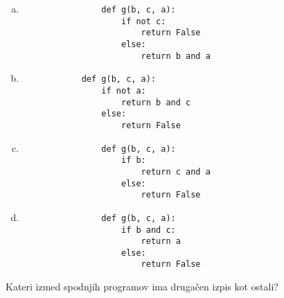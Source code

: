 \documentclass[arhiv, 10pt]{../izpit}
\begin{document}
        \begin{multicols}{2}
        \begin{enumerate}[(a)]
\item 
                \begin{verbatim}
                def g(b, c, a):
                    if not c:
                        return False
                    else:
                        return b and a
                \end{verbatim}
            
\item 
            \begin{verbatim}
            def g(b, c, a):
                if not a:
                    return b and c
                else:
                    return False
            \end{verbatim}
        
\item 
                \begin{verbatim}
                def g(b, c, a):
                    if b:
                        return c and a
                    else:
                        return False
                \end{verbatim}
            
\item 
                \begin{verbatim}
                def g(b, c, a):
                    if b and c:
                        return a
                    else:
                        return False
                \end{verbatim}
            
\end{enumerate}

        \end{multicols}
    
        \naloga*
        
        Kateri izmed spodnjih programov ima drugačen izpis kot ostali?
    
\end{document}
